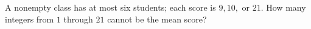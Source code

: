 A nonempty class has at most six students; each score is $9,10,$ or $21$. How many integers from $1$ through $21$ cannot be the mean score?
